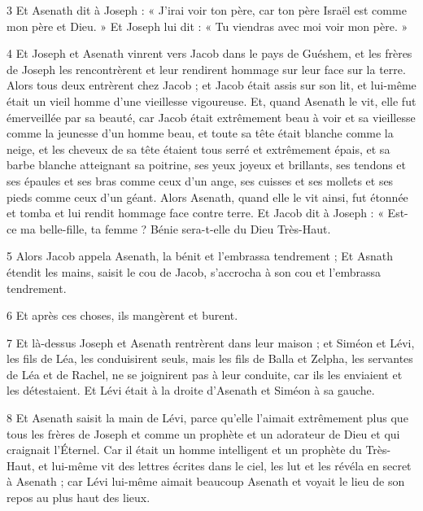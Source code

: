 \par 3 Et Asenath dit à Joseph : « J'irai voir ton père, car ton père Israël est comme mon père et Dieu. » Et Joseph lui dit : « Tu viendras avec moi voir mon père. »

\par 4 Et Joseph et Asenath vinrent vers Jacob dans le pays de Guéshem, et les frères de Joseph les rencontrèrent et leur rendirent hommage sur leur face sur la terre. Alors tous deux entrèrent chez Jacob ; et Jacob était assis sur son lit, et lui-même était un vieil homme d'une vieillesse vigoureuse. Et, quand Asenath le vit, elle fut émerveillée par sa beauté, car Jacob était extrêmement beau à voir et sa vieillesse comme la jeunesse d'un homme beau, et toute sa tête était blanche comme la neige, et les cheveux de sa tête étaient tous serré et extrêmement épais, et sa barbe blanche atteignant sa poitrine, ses yeux joyeux et brillants, ses tendons et ses épaules et ses bras comme ceux d'un ange, ses cuisses et ses mollets et ses pieds comme ceux d'un géant. Alors Asenath, quand elle le vit ainsi, fut étonnée et tomba et lui rendit hommage face contre terre. Et Jacob dit à Joseph : « Est-ce ma belle-fille, ta femme ? Bénie sera-t-elle du Dieu Très-Haut.

\par 5 Alors Jacob appela Asenath, la bénit et l'embrassa tendrement ; Et Asnath étendit les mains, saisit le cou de Jacob, s'accrocha à son cou et l'embrassa tendrement.

\par 6 Et après ces choses, ils mangèrent et burent.

\par 7 Et là-dessus Joseph et Asenath rentrèrent dans leur maison ; et Siméon et Lévi, les fils de Léa, les conduisirent seuls, mais les fils de Balla et Zelpha, les servantes de Léa et de Rachel, ne se joignirent pas à leur conduite, car ils les enviaient et les détestaient. Et Lévi était à la droite d'Asenath et Siméon à sa gauche.

\par 8 Et Asenath saisit la main de Lévi, parce qu'elle l'aimait extrêmement plus que tous les frères de Joseph et comme un prophète et un adorateur de Dieu et qui craignait l'Éternel. Car il était un homme intelligent et un prophète du Très-Haut, et lui-même vit des lettres écrites dans le ciel, les lut et les révéla en secret à Asenath ; car Lévi lui-même aimait beaucoup Asenath et voyait le lieu de son repos au plus haut des lieux.

